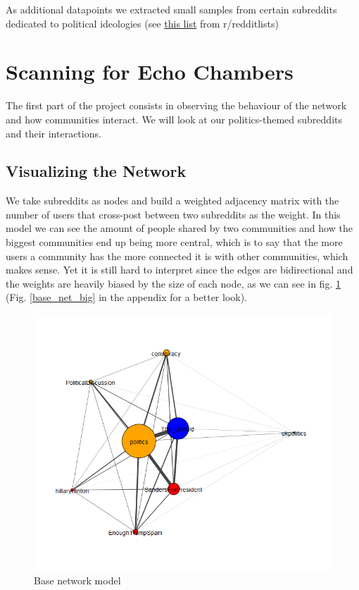 \documentclass[11pt]{article}
\begin{document}
As additional datapoints we extracted small samples from certain subreddits dedicated to political ideologies (see \href{https://www.reddit.com/r/redditlists/comments/josdr/list_of_political_subreddits/}{this list} from r/redditlists)	

\section{Scanning for Echo Chambers}

The first part of the project consists in observing the behaviour of the network and how communities interact. We will look at our politics-themed subreddits and their interactions.

\subsection{Visualizing the Network}
We take subreddits as nodes and build a weighted adjacency matrix with the number of users that cross-post between two subreddits as the weight. In this model we can see the amount of people shared by two communities and how the biggest communities end up being more central, which is to say that the more users a community has the more connected it is with other communities, which makes sense. Yet it is still hard to interpret since the edges are bidirectional and the weights are heavily biased by the size of each node, as we can see in fig. \ref{base_net} (Fig. \ref{base_net_big} in the appendix for a better look).

\begin{figure}[h]
	\includegraphics[width=\columnwidth]{img/base_network.png}
	\caption{\label{base_net} Base network model}
\end{figure}
\end{document}
